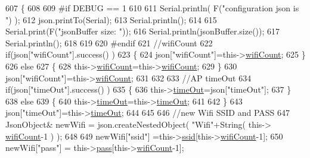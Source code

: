 \begin{DoxyCode}
607         \{
608         
609 \textcolor{preprocessor}{        #if DEBUG == 1 }
610         
611             Serial.println( F(\textcolor{stringliteral}{"configuration json is "}) );
612             json.printTo(Serial);
613             Serial.println();
614 
615             Serial.print(F(\textcolor{stringliteral}{"jsonBuffer size: "}));
616             Serial.println(jsonBuffer.size());
617             Serial.println();
618 
619 
620 \textcolor{preprocessor}{        #endif}
621             \textcolor{comment}{//wifiCount}
622             \textcolor{keywordflow}{if}(json[\textcolor{stringliteral}{"wifiCount"}].success() )
623             \{           
624                 json[\textcolor{stringliteral}{"wifiCount"}]=this->\hyperlink{class_cool_wifi_ab133bd92fcb895b884deecd6678592e4}{wifiCount};
625             \}
626             \textcolor{keywordflow}{else}
627             \{
628                 this->\hyperlink{class_cool_wifi_ab133bd92fcb895b884deecd6678592e4}{wifiCount}=this->\hyperlink{class_cool_wifi_ab133bd92fcb895b884deecd6678592e4}{wifiCount};
629             \}
630             json[\textcolor{stringliteral}{"wifiCount"}]=this->\hyperlink{class_cool_wifi_ab133bd92fcb895b884deecd6678592e4}{wifiCount};
631 
632             
633             \textcolor{comment}{//AP timeOut}
634             \textcolor{keywordflow}{if}(json[\textcolor{stringliteral}{"timeOut"}].success() )
635             \{
636                 this->\hyperlink{class_cool_wifi_a952111605f25156588b5632caaba1c6f}{timeOut}=json[\textcolor{stringliteral}{"timeOut"}];
637             \}
638             \textcolor{keywordflow}{else}
639             \{
640                 this->\hyperlink{class_cool_wifi_a952111605f25156588b5632caaba1c6f}{timeOut}=this->\hyperlink{class_cool_wifi_a952111605f25156588b5632caaba1c6f}{timeOut};
641 
642             \}
643             json[\textcolor{stringliteral}{"timeOut"}]=this->\hyperlink{class_cool_wifi_a952111605f25156588b5632caaba1c6f}{timeOut};
644             
645             
646             \textcolor{comment}{//new Wifi SSID and PASS}
647             JsonObject& newWifi = json.createNestedObject( \textcolor{stringliteral}{"Wifi"}+String( this->
      \hyperlink{class_cool_wifi_ab133bd92fcb895b884deecd6678592e4}{wifiCount}-1 ) );
648             
649             newWifi[\textcolor{stringliteral}{"ssid"}] =this->\hyperlink{class_cool_wifi_a893b21d0fed821438733bba2e73fb4c2}{ssid}[this->\hyperlink{class_cool_wifi_ab133bd92fcb895b884deecd6678592e4}{wifiCount}-1];
650             newWifi[\textcolor{stringliteral}{"pass"}] = this->\hyperlink{class_cool_wifi_a0c3332a149245aaad060b32593a54c9b}{pass}[this->\hyperlink{class_cool_wifi_ab133bd92fcb895b884deecd6678592e4}{wifiCount}-1];

\end{DoxyCode}
